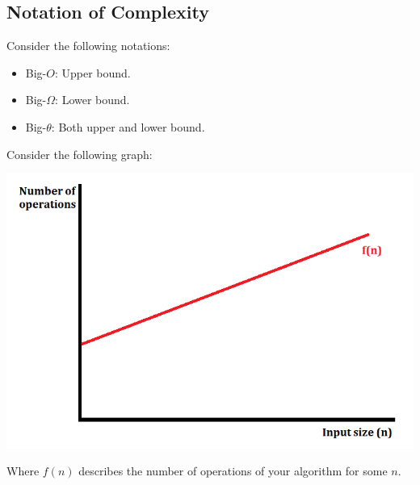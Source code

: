 \documentclass[letterpaper]{article}
\begin{document}
\subsection{Notation of Complexity}
Consider the following notations: 
\begin{itemize}
    \item Big-$O$: Upper bound. 
    \item Big-$\Omega$: Lower bound. 
    \item Big-$\theta$: Both upper and lower bound. 
\end{itemize}
Consider the following graph: 
\begin{center}
    \includegraphics[scale=0.5]{img/graph1.PNG}
\end{center}
Where $f(n)$ describes the number of operations of your algorithm for some $n$. 
\end{document}
